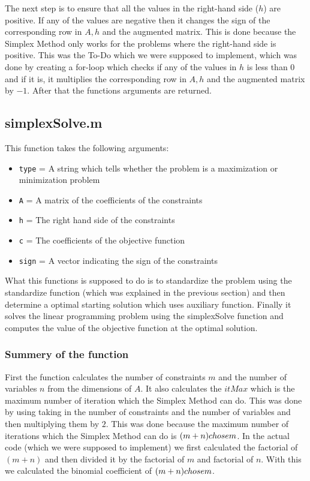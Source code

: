 \documentclass[unicode,11pt,a4paper,oneside,numbers=endperiod,openany]{scrartcl}
\begin{document}
The next step is to ensure that all the values in the right-hand side ($h$) are positive. If any of the values are negative then it changes the sign of the corresponding row in $A, h$ and the augmented matrix. This is done because the Simplex Method only works for the problems where the right-hand side is positive. This was the To-Do which we were supposed to implement, which was done by creating a for-loop which checks if any of the values in $h$ is less than $0$ and if it is, it multiplies the corresponding row in $A, h$ and the augmented matrix by $-1$. After that the functions arguments are returned.

\subsection{simplexSolve.m}
This function takes the following arguments:

\begin{itemize}
	\item \texttt{type} = A string which tells whether the problem is a maximization or minimization problem
	\item \texttt{A} = A matrix of the coefficients of the constraints
	\item \texttt{h} = The right hand side of the constraints
	\item \texttt{c} = The coefficients of the objective function
	\item \texttt{sign} = A vector indicating the sign of the constraints
\end{itemize}

What this functions is supposed to do is to standardize the problem using the standardize function (which was explained in the previous section) and then determine a optimal starting solution which uses auxiliary function. Finally it solves the linear programming problem using the simplexSolve function and computes the value of the objective function at the optimal solution.

\subsubsection{Summery of the function}
First the function calculates the number of constraints $m$ and the number of variables $n$ from the dimensions of $A$. It also calculates the $itMax$ which is the maximum number of iteration which the Simplex Method can do. This was done by using taking in the number of constraints and the number of variables and then multiplying them by $2$. This was done because the maximum number of iterations which the Simplex Method can do is $(m + n) \space chose \space m$. In the actual code (which we were supposed to implement) we first calculated the factorial of $(m + n)$ and then divided it by the factorial of $m$ and factorial of $n$. With this we calculated the binomial coefficient of $(m + n) \space chose \space m$.
\end{document}
